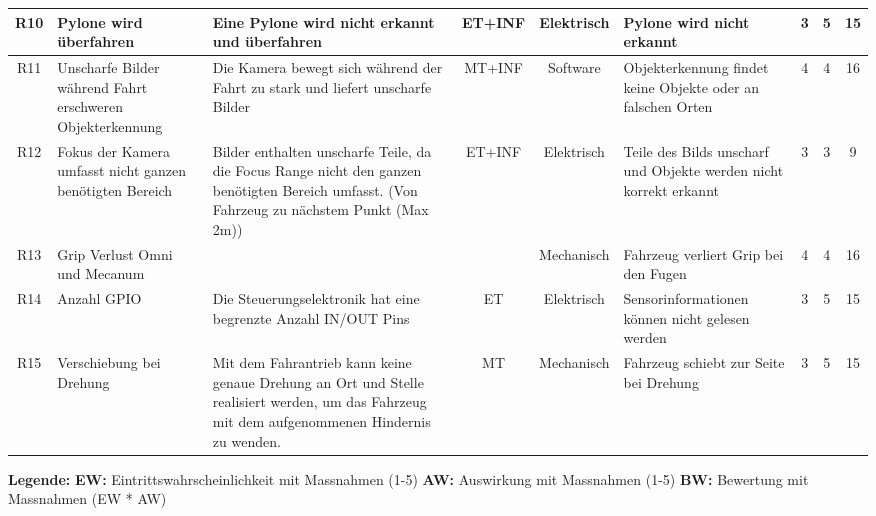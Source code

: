 \begin{landscape}
\begin{longtable}{|c|p{4cm}|p{6cm}|c|c|p{4cm}|c|c|c|}
R10 & Pylone wird überfahren & Eine Pylone wird nicht erkannt und überfahren & ET+INF & Elektrisch & Pylone wird nicht erkannt & 3 & 5 & 15 \\ \hline
R11 & Unscharfe Bilder während Fahrt erschweren Objekterkennung & Die Kamera bewegt sich während der Fahrt zu stark und liefert unscharfe Bilder & MT+INF & Software & Objekterkennung findet keine Objekte oder an falschen Orten & 4 & 4 & 16 \\ \hline
R12 & Fokus der Kamera umfasst nicht ganzen benötigten Bereich & Bilder enthalten unscharfe Teile, da die Focus Range nicht den ganzen benötigten Bereich umfasst. (Von Fahrzeug zu nächstem Punkt (Max 2m)) & ET+INF & Elektrisch & Teile des Bilds unscharf und Objekte werden nicht korrekt erkannt & 3 & 3 & 9 \\ \hline
R13 & Grip Verlust Omni und Mecanum & & & Mechanisch & Fahrzeug verliert Grip bei den Fugen & 4 & 4 & 16 \\ \hline
R14 & Anzahl GPIO & Die Steuerungselektronik hat eine begrenzte Anzahl IN/OUT Pins & ET & Elektrisch & Sensorinformationen können nicht gelesen werden & 3 & 5 & 15 \\ \hline
R15 & Verschiebung bei Drehung & Mit dem Fahrantrieb kann keine genaue Drehung an Ort und Stelle realisiert werden, um das Fahrzeug mit dem aufgenommenen Hindernis zu wenden. & MT & Mechanisch & Fahrzeug schiebt zur Seite bei Drehung & 3 & 5 & 15 \\ \hline
\end{longtable}

\newpage

\textbf{Legende:}
\hspace{1cm}
\textbf{EW:} Eintrittswahrscheinlichkeit mit Massnahmen (1-5)
\hspace{1cm}
\textbf{AW:} Auswirkung mit Massnahmen  (1-5)
\hspace{1cm}
\textbf{BW:} Bewertung mit Massnahmen (EW * AW)


\end{landscape}

